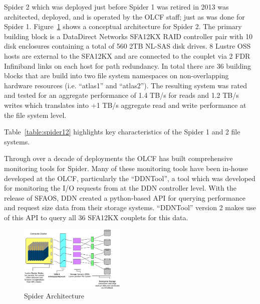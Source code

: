 Spider 2 which was deployed just before Spider 1 was retired in 2013 was
architected, deployed, and is operated by the OLCF staff; just as was done for
Spider 1. Figure~\ref{fig:arch} shows a conceptual architecture for Spider 2.
The primary building block is a DataDirect Networks SFA12KX RAID controller
pair with 10 disk enclosures containing a total of 560 2TB NL-SAS disk drives.
8 Lustre OSS hosts are external to the SFA12KX and are connected to the couplet
via 2 FDR Infiniband links on each host for path redundancy. In total there are
36 building blocks that are build into two file system namespaces on
non-overlapping hardware resources (i.e. ``atlas1'' and ``atlas2''). The
resulting system was rated and tested for an aggregate performance of 1.4 TB/s
for reads and 1.2 TB/s writes which translates into +1 TB/s aggregate read and
write performance at the file system level.

Table~\ref{table:spider12} highlights key characteristics of the Spider 1 and 2
file systems.

Through over a decade of deployments the OLCF has built comprehensive
monitoring tools for Spider\cite{olcf-monitoring}. Many of these monitoring
tools have been in-house developed at the OLCF, particularly the ``DDNTool'', a
tool which was developed for monitoring the I/O requests from at the DDN
controller level. With the release of SFAOS, DDN created a python-based API for
querying performance and request size data from their storage systems.
``DDNTool'' version 2 makes use of this API to query all 36 SFA12KX couplets
for this data.


\begin{figure}[!t]
\centering
\includegraphics[width=0.45\textwidth]{./figs/spider2arch.ps}
\vspace{-0.1in}
\centering
\caption{Spider Architecture}
\label{fig:arch}
\end{figure}


